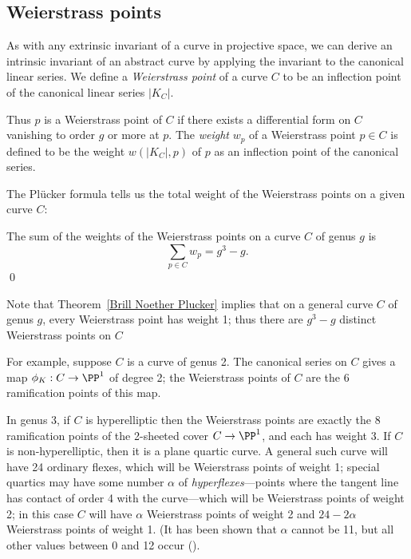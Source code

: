 \subsection{Weierstrass points}

As with any extrinsic invariant of a curve in projective space, we can derive an intrinsic invariant of an abstract curve by applying the invariant to the canonical linear series. We define a \emph{Weierstrass point} of a curve $C$ to be an inflection point of the canonical linear series $|K_C|$. 

Thus $p$ is a Weierstrass point of $C$ if there exists a  differential form on $C$ vanishing to order $g$ or more at $p$. The \emph{weight} $w_p$ of a Weierstrass point $p \in C$  is defined to be the weight $w(|K_C|,p)$ of $p$ as an inflection point of the canonical series. 

The Pl\"ucker formula tells us  the total weight of the Weierstrass points on a given curve $C$:

\begin{corollary}\label{plucker formula}
The sum of the weights of the Weierstrass points on a curve $C$ of genus $g$ is
$$
\sum_{p \in C} w_p = g^3-g.
$$\qed
\end{corollary}

Note that Theorem~\ref{Brill Noether Plucker} implies that on a general curve $C$ of genus $g$, every Weierstrass point has weight 1; thus there are $g^3-g$ distinct Weierstrass points on $C$


For example, suppose $C$ is a curve of genus 2. The canonical series on $C$ gives a map $\phi_K : C \to \PP^1$ of degree 2; the Weierstrass points of $C$ are the 6 ramification points of this map. 

In genus 3, if $C$ is hyperelliptic then the Weierstrass points are exactly the 8 ramification points of the 2-sheeted cover $C \to \PP^1$, and each has weight 3. If $C$ is non-hyperelliptic, then it is a plane quartic curve. A general such curve will have 24 ordinary flexes, which will be Weierstrass points of weight 1; special quartics may have some number $\alpha$ of \emph{hyperflexes}---points where the tangent line has contact of order 4 with the curve---which will be Weierstrass points of weight 2; in this case $C$ will have $\alpha$ Weierstrass points of weight 2 and $24-2\alpha$ Weierstrass points of weight 1. (It has been shown that $\alpha$ cannot be 11, but  all  other values  between 0 and 12 occur (\cite{Vermeulen}).


